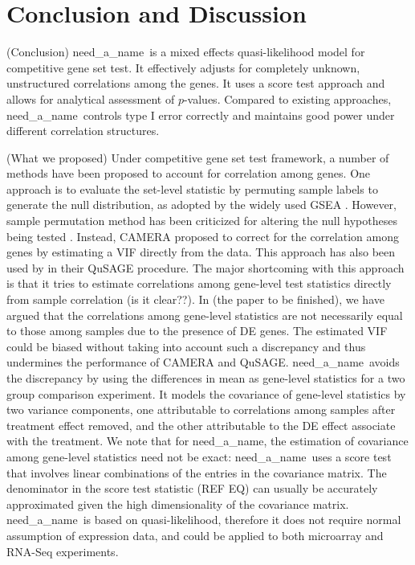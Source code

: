 \documentclass[useAMS,usenatbib, galley]{biom}
\newcommand{\OurMethod}{need\_a\_name}
\begin{document}
	\section{Conclusion and Discussion}\label{section:conclusion}
	
	(Conclusion) \OurMethod~is a mixed effects quasi-likelihood model for competitive gene set test. It effectively adjusts for completely unknown, unstructured correlations among the genes. It uses a score test approach and allows for analytical assessment of $p$-values. Compared to existing approaches, \OurMethod~controls type I error correctly and maintains good power under different correlation structures.  
	
	
	(What we proposed) Under competitive gene set test framework, a number of methods have been proposed to account for correlation among genes. One approach is to evaluate the set-level statistic by permuting sample labels to generate the null distribution, as adopted by the widely used GSEA \citep{subramanian2005gene}. However, sample permutation method has been criticized for  altering the null hypotheses being tested \citep{goeman2007analyzing, khatri2012ten}. Instead, CAMERA \citep{wu2012camera} proposed to correct for the correlation among genes by estimating a VIF directly from the data. This approach has also been used by \cite{yaari2013quantitative} in their QuSAGE procedure. The major shortcoming with this approach is that it tries to estimate correlations among gene-level test statistics directly from sample correlation (is it clear??). In (the paper to be finished), we have argued that the correlations among gene-level statistics are not necessarily equal to those among samples due to the presence of DE genes. The estimated VIF could be biased without taking into account such a discrepancy and thus undermines the performance of CAMERA and QuSAGE. \OurMethod~avoids the discrepancy by using the differences in mean as gene-level statistics for a two group comparison experiment. It models the covariance of gene-level statistics by two variance components, one attributable to correlations among samples after treatment effect removed, and the other attributable to the DE effect associate with the treatment. We note that for \OurMethod, the estimation of covariance among gene-level statistics need not be exact: \OurMethod~uses a score test that involves linear combinations of the entries in the covariance matrix. The denominator in the score test statistic (REF EQ) can usually be accurately approximated given the high dimensionality of the covariance matrix. \OurMethod~is based on quasi-likelihood, therefore it does not require normal assumption of expression data, and could be applied to both microarray and RNA-Seq experiments. 
	
\end{document}

